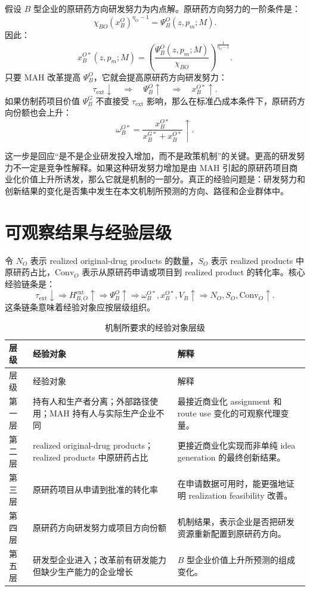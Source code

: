 \documentclass[12pt]{article}
\newcommand{\tauext}{\tau_{\mathrm{ext}}}
\newcommand{\Conv}{\mathrm{Conv}}
\begin{document}
假设 $B$ 型企业的原研药方向研发努力为内点解。原研药方向努力的一阶条件是：
\[
\chi_{BO}(x_B^O)^{\eta_O-1}=\Psi_B^O(z,p_m;M).
\]
因此：
\[
x_B^{O*}(z,p_m;M)=\left(\frac{\Psi_B^O(z,p_m;M)}{\chi_{BO}}\right)^{\frac{1}{\eta_O-1}}.
\]
只要 MAH 改革提高 $\Psi_B^O$，它就会提高原研药方向研发努力：
\[
\tauext \downarrow \quad \Rightarrow \quad \Psi_B^O \uparrow \quad \Rightarrow \quad x_B^{O*}\uparrow.
\]
如果仿制药项目价值 $\Psi_B^G$ 不直接受 $\tauext$ 影响，那么在标准凸成本条件下，原研药方向份额也会上升：
\[
\omega_B^{O*}=\frac{x_B^{O*}}{x_B^{G*}+x_B^{O*}}\uparrow.
\]

这一步是回应“是不是企业研发投入增加，而不是政策机制”的关键。更高的研发努力不一定是竞争性解释。如果这种研发努力增加是由 MAH 引起的原研药项目商业化价值上升所诱发，那么它就是机制的一部分。真正的经验问题是：研发努力和创新结果的变化是否集中发生在本文机制所预测的方向、路径和企业群体中。

\section{可观察结果与经验层级}

令 $N_O$ 表示 realized original-drug products 的数量，$S_O$ 表示 realized products 中原研药占比，$\Conv_O$ 表示从原研药申请或项目到 realized product 的转化率。核心经验链条是：
\[
\tauext \downarrow
\Rightarrow H_{B,O}^{\mathrm{ext}} \uparrow
\Rightarrow \Psi_B^O \uparrow
\Rightarrow \omega_B^{O*},x_B^{O*},V_B \uparrow
\Rightarrow N_O,S_O,\Conv_O \uparrow.
\]
这条链条意味着经验对象应按层级组织。

\begin{longtable}{p{}p{}p{}}
\caption{机制所要求的经验对象层级}\label{tab:hierarchy_cn}\\
\toprule
层级 & 经验对象 & 解释 \\
\midrule
\endfirsthead
\toprule
层级 & 经验对象 & 解释 \\
\midrule
\endhead
第一层 & 持有人和生产者分离；外部路径使用；MAH 持有人与实际生产企业不同 & 最接近商业化 assignment 和 route use 变化的可观察代理变量。 \\
\addlinespace
第二层 & realized original-drug products；realized products 中原研药占比 & 更接近商业化实现而非单纯 idea generation 的最终创新结果。 \\
\addlinespace
第三层 & 原研药项目从申请到批准的转化率 & 在申请数据可用时，能更强地证明 realization feasibility 改善。 \\
\addlinespace
第四层 & 原研药方向研发努力或项目方向份额 & 机制结果，表示企业是否把研发资源重新配置到原研药方向。 \\
\addlinespace
第五层 & 研发型企业进入；改革前有研发能力但缺少生产能力的企业增长 & $B$ 型企业价值上升所预测的组成变化。 \\
\bottomrule
\end{longtable}
\end{document}
